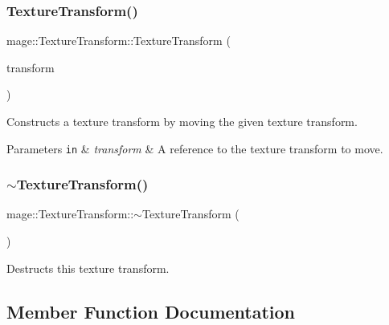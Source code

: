 \subsubsection{\texorpdfstring{Texture\+Transform()}{TextureTransform()}\hspace{0.1cm}{\footnotesize\ttfamily [4/4]}}
{\footnotesize\ttfamily mage\+::\+Texture\+Transform\+::\+Texture\+Transform (\begin{DoxyParamCaption}\item[{\hyperlink{classmage_1_1_texture_transform}{Texture\+Transform} \&\&}]{transform }\end{DoxyParamCaption})\hspace{0.3cm}{\ttfamily [default]}}

Constructs a texture transform by moving the given texture transform.


\begin{DoxyParams}[1]{Parameters}
\mbox{\tt in}  & {\em transform} & A reference to the texture transform to move. \\
\hline
\end{DoxyParams}
\hypertarget{classmage_1_1_texture_transform_afb608ccc7bc107b893ea68937529a901}{}\label{classmage_1_1_texture_transform_afb608ccc7bc107b893ea68937529a901} 
\subsubsection{\texorpdfstring{$\sim$\+Texture\+Transform()}{~TextureTransform()}}
{\footnotesize\ttfamily mage\+::\+Texture\+Transform\+::$\sim$\+Texture\+Transform (\begin{DoxyParamCaption}{ }\end{DoxyParamCaption})\hspace{0.3cm}{\ttfamily [default]}}

Destructs this texture transform. 

\subsection{Member Function Documentation}
\hypertarget{classmage_1_1_texture_transform_ab66d7a0aeee748829636290c6222a26a}{}\label{classmage_1_1_texture_transform_ab66d7a0aeee748829636290c6222a26a} 

